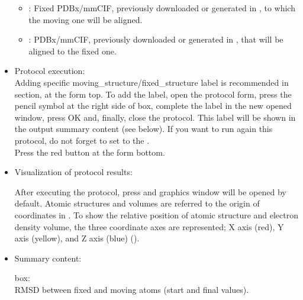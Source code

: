 \begin{itemize}
   \begin{itemize}
    \item {}: Fixed PDBx/mmCIF, previously downloaded or generated in \scipion, to which the moving one will be aligned. 
    \item {}: PDBx/mmCIF, previously downloaded or generated in \scipion, that will be aligned to the fixed one.
   \end{itemize}
 
 \item Protocol execution:\\
 Adding specific moving\_structure/fixed\_structure label is recommended in  section, at the form top. To add the label, open the protocol form, press the pencil symbol at the right side of  box, complete the label in the new opened window, press OK and, finally, close the protocol. This label will be shown in the output summary content (see below). If you want to run again this protocol, do not forget to set to  the .\\
  Press the  red button at the form bottom.
  
 \item Visualization of protocol results:
 
 After executing the protocol, press  and \chimera graphics window will be opened by default. Atomic structures and volumes are referred to the origin of coordinates in \chimera. To show the relative position of atomic structure and electron density volume, the three coordinate axes are represented; X axis (red), Y axis (yellow), and Z axis (blue) ().
    
 \item Summary content:
 
   box:\\RMSD between fixed and moving atoms (start and final values).
\end{itemize}

